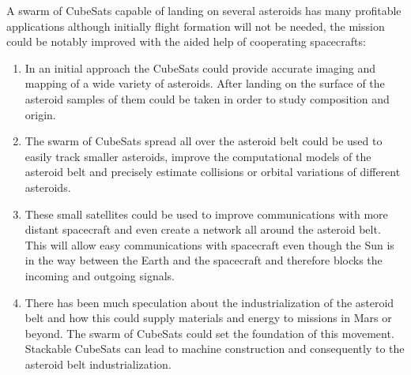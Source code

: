 A swarm of CubeSats capable of landing on several asteroids has many
profitable applications although initially flight formation will not
be needed, the mission could be notably improved with the aided help
of cooperating spacecrafts:
\begin{enumerate}
\item In an initial approach the CubeSats could provide accurate imaging
and mapping of a wide variety of asteroids. After landing on the surface
of the asteroid samples of them could be taken in order to study composition
and origin.
\item The swarm of CubeSats spread all over the asteroid belt could be used
to easily track smaller asteroids, improve the computational models
of the asteroid belt and precisely estimate collisions or orbital
variations of different asteroids.
\item These small satellites could be used to improve communications with
more distant spacecraft and even create a network all around the asteroid
belt. This will allow easy communications with spacecraft even though
the Sun is in the way between the Earth and the spacecraft and therefore
blocks the incoming and outgoing signals.
\item There has been much speculation about the industrialization of the
asteroid belt and how this could supply materials and energy to missions
in Mars or beyond. The swarm of CubeSats could set the foundation
of this movement. Stackable CubeSats can lead to machine construction
and consequently to the asteroid belt industrialization.
\end{enumerate}

